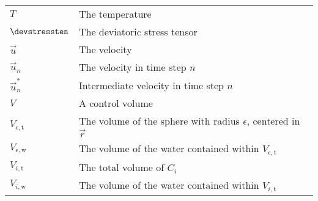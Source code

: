\begin{center}
\begin{longtabu}{l X}
        $T$                 & The temperature \\
        $\devstressten$     & The deviatoric stress tensor \\
        $\vec{u}$           & The velocity \\
        $\vec{u}_n$         & The velocity in time step $n$ \\
        $\vec{u}^*_n$       & Intermediate velocity in time step $n$ \\
        $V$                 & A control volume \\
        $V_{\epsilon,\text{t}}$     & The volume of the sphere with radius $\epsilon$,
                                      centered in $\vec{r}$ \\
        $V_{\epsilon,\text{w}}$     & The volume of the water contained within $V_{\epsilon,\text{t}}$ \\
        $V_{i,\text{t}}$    & The total volume of $C_i$ \\
        $V_{i,\text{w}}$    & The volume of the water contained within $V_{i,\text{t}}$ \\
    \end{longtabu}
    \end{center}

